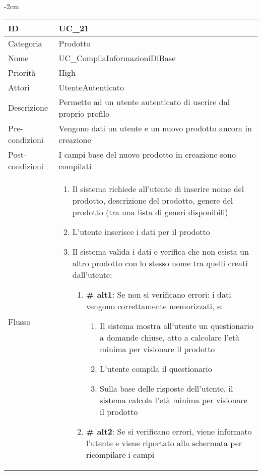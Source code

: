 \begin{center}
\begin{table}[bp]
    \centering
    \addtolength{\leftskip} {-2cm}
\begin{tabular}{ |p{2.6cm}|p{13cm}|  }
\hline
ID & UC\_21\\\hline
Categoria & Prodotto \\\hline
Nome & UC\_CompilaInformazioniDiBase \\\hline
Priorità & High \\\hline
Attori &  UtenteAutenticato \\\hline
Descrizione & Permette ad un utente autenticato di uscrire dal proprio profilo \\\hline
Pre-condizioni &  Vengono dati un utente e un nuovo prodotto ancora in creazione\\\hline
Post-condizioni &  I campi base del nuovo prodotto in creazione sono compilati\\\hline
Flusso &  	\begin{enumerate}
			\item Il sistema richiede all'utente di inserire nome del prodotto, descrizione del prodotto, genere del prodotto (tra una lista di generi disponibili)
			\item L'utente inserisce i dati per il prodotto
			\item Il sistema valida i dati e verifica che non esista un altro prodotto con lo stesso nome tra quelli creati dall'utente:
			\begin{enumerate}[  ]
				\item \textbf{\# alt1}: Se non si verificano errori: i dati vengono correttamente memorizzati, e:
				\begin{enumerate}[label*=\arabic*.]
					\item Il sistema mostra all'utente un questionario a domande chiuse, atto a calcolare l'età minima per visionare il prodotto
					\item L'utente compila il questionario
					\item Sulla base delle risposte dell'utente, il sistema calcola l'età minima per visionare il prodotto
				\end{enumerate}
				\item \textbf{\# alt2}: Se si verificano errori, viene informato l'utente e viene riportato alla schermata per ricompilare i campi
			\end{enumerate}
		\end{enumerate}\\\hline
\end{tabular}
\label{table_use_case:21}\newline
\end{table}


\end{center}
